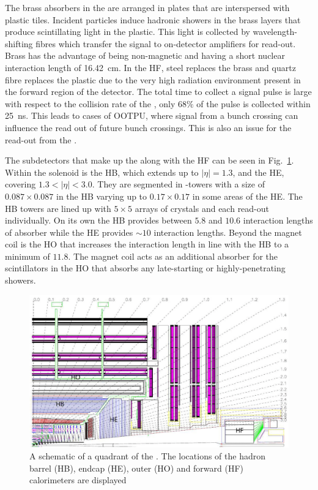 The brass absorbers in the \HCAL are arranged in plates that are interspersed with
plastic tiles. Incident particles induce hadronic showers in the
brass layers that produce scintillating light in the plastic. This
light is collected by wavelength-shifting fibres which transfer the
signal to on-detector amplifiers for read-out. Brass has the advantage
of being non-magnetic and having a short nuclear interaction length
of 16.42~cm. In the \ac{HF}, steel replaces the brass and quartz fibre
replaces the plastic due to the very high radiation environment
present in the forward region of the detector. The total time to
collect a \HCAL signal pulse is large with respect to the collision
rate of the \LHC, only $68\%$ of the pulse is collected within 25~ns.
This leads to cases of \ac{OOTPU}, where signal from a bunch
crossing can influence the read out of future bunch crossings. This
is also an issue for the read-out from the \ECAL.

The subdetectors that make up the \HCAL along with the \ac{HF} can be
seen in Fig.~\ref{fig:hcal}. Within the solenoid is the \ac{HB},
which extends up to $|\eta|=1.3$, and the \ac{HE}, covering
$1.3<|\eta|<3.0$. They are segmented in \eta-\phi towers with a size
of $0.087\times0.087$ in the \ac{HB} varying up to $0.17\times0.17$ in
some areas of the \ac{HE}. The \ac{HB} towers are lined up with
$5\times5$ arrays of \ECAL crystals and each read-out individually. On
its own the \ac{HB} provides between $5.8$ and $10.6$ interaction
lengths of absorber while the \ac{HE} provides $\sim10$ interaction
lengths. Beyond the magnet coil is the \ac{HO} that increases the
interaction length in line with the \ac{HB} to a minimum of $11.8$.
The magnet coil acts as an additional absorber for the scintillators in the
\ac{HO} that absorbs any late-starting or highly-penetrating showers.

\begin{figure}
\begin{center}
\includegraphics[width=0.8\linewidth]{figs/cms_HCAL} \end{center}
\caption{ A schematic of a quadrant of the \CMS \HCAL. The locations of the hadron
barrel (HB), endcap (HE), outer (HO) and forward (HF) calorimeters are
displayed \cite{Chatrchyan:2008aa}}
\label{fig:hcal} \end{figure}

